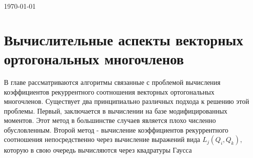 \documentclass[12pt, a4paper]{report}
\begin{document}

\begin{flushright}
\today
\tableofcontents
\end{flushright}













\chapter{Вычислительные аспекты векторных ортогональных многочленов}
В главе рассматриваются алгоритмы связанные с проблемой
вычисления коэффициентов рекуррентного соотношения векторных
ортогональных многочленов. Существует два принципиально различных
подхода к решению этой проблемы. Первый, заключается в вычислении
на базе модифицированных моментов. Этот метод в большинстве
случаев является плохо численно обусловленным. Второй метод -
вычисление коэффициентов рекуррентного соотношения
непосредственно через вычисление выражений вида $L_j(Q_i,Q_k)$,
которую в свою очередь вычисляются через квадратуры Гаусса




\end{document}
